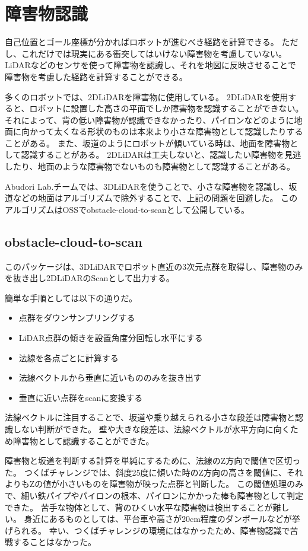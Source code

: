 \section{障害物認識}
自己位置とゴール座標が分かればロボットが進むべき経路を計算できる。
ただし、これだけでは現実にある衝突してはいけない障害物を考慮していない。
LiDARなどのセンサを使って障害物を認識し、それを地図に反映させることで障害物を考慮した経路を計算することができる。

多くのロボットでは、2DLiDARを障害物に使用している。
2DLiDARを使用すると、ロボットに設置した高さの平面でしか障害物を認識することができない。
それによって、背の低い障害物が認識できなかったり、パイロンなどのように地面に向かって太くなる形状のものは本来より小さな障害物として認識したりすることがある。
また、坂道のようにロボットが傾いている時は、地面を障害物として認識することがある。
2DLiDARは工夫しないと、認識したい障害物を見逃したり、地面のような障害物でないものも障害物として認識することがある。

Abudori Lab.チームでは、3DLiDARを使うことで、小さな障害物を認識し、坂道などの地面はアルゴリズムで除外することで、上記の問題を回避した。
このアルゴリズムはOSSでobstacle-cloud-to-scan\cite{obstacle}として公開している。

\subsection{obstacle-cloud-to-scan}
このパッケージは、3DLiDARでロボット直近の3次元点群を取得し、障害物のみを抜き出し2DLiDARのScanとして出力する。

簡単な手順としては以下の通りだ。
\begin{itemize}
    \item 点群をダウンサンプリングする
    \item LiDAR点群の傾きを設置角度分回転し水平にする
    \item 法線を各点ごとに計算する
    \item 法線ベクトルから垂直に近いもののみを抜き出す
    \item 垂直に近い点群をscanに変換する
\end{itemize}

法線ベクトルに注目することで、坂道や乗り越えられる小さな段差は障害物と認識しない判断ができた。
壁や大きな段差は、法線ベクトルが水平方向に向くため障害物として認識することができた。

障害物と坂道を判断する計算を単純にするために、法線のZ方向で閾値で区切った。
つくばチャレンジでは、斜度25度に傾いた時のZ方向の高さを閾値に、それよりもZの値が小さいものを障害物が映った点群と判断した。
この閾値処理のみで、細い鉄パイプやパイロンの根本、パイロンにかかった棒も障害物として判定できた。
苦手な物体として、背のひくい水平な障害物は検出することが難しい。
身近にあるものとしては、平台車や高さが20cm程度のダンボールなどが挙げられる。
幸い、つくばチャレンジの環境にはなかったため、障害物認識で苦戦することはなかった。

